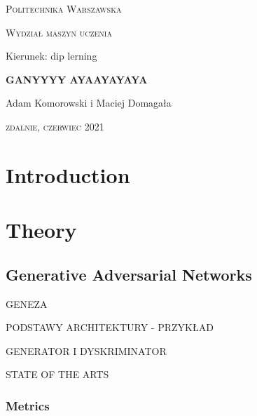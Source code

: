 \documentclass[12pt,a4paper,openany]{book}
\begin{document}
\begin{titlepage}
\begin{flushleft}
\end{flushleft}
\begin{center}
\textsc{{\huge Politechnika Warszawska}}
\end{center}
\bigskip
\bigskip
\begin{center}
\textsc{{\Large Wydział maszyn uczenia}}
\end{center}
\bigskip
\bigskip
\begin{center}
\begin{Large}
Kierunek: dip lerning
\end{Large}
\end{center}
\bigskip
\bigskip
\noindent\hrulefill
\begin{center}
\textsc{\textbf{{\large GANYYYY AYAAYAYAYA
\\}}}
\bigskip
\bigskip

{\large 
Adam Komorowski i Maciej Domagała}

\end{center}
\noindent\hrulefill
\bigskip
\bigskip
\begin{center}
\end{center}
\bigskip
\bigskip
\bigskip
\bigskip
\begin{center}
{\textsc{\large zdalnie, czerwiec 2021
}}
\end{center}
\end{titlepage}

\tableofcontents

\chapter*{Introduction}

\chapter{Theory}

\section{Generative Adversarial Networks}

GENEZA

PODSTAWY ARCHITEKTURY - PRZYKŁAD

GENERATOR I DYSKRIMINATOR

STATE OF THE ARTS


\subsection{Metrics}
\end{document}
